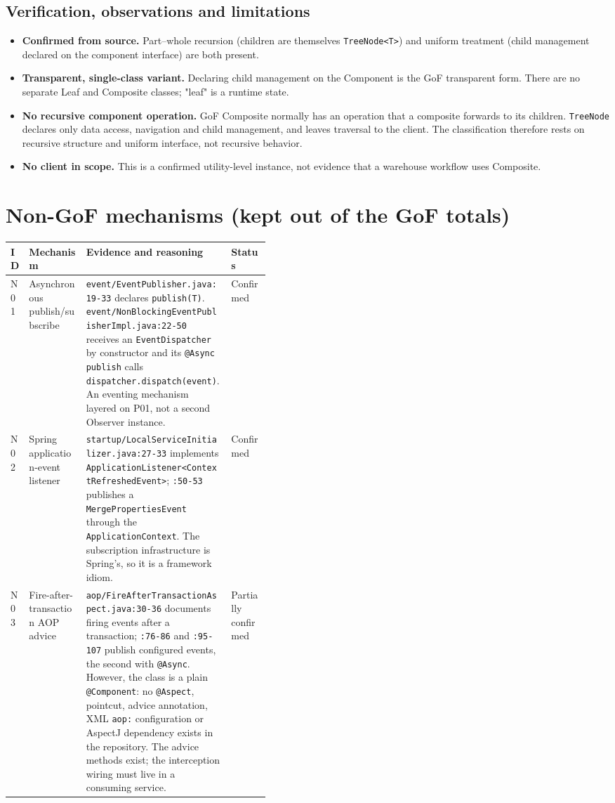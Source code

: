 \documentclass[11pt,a4paper]{article}
\newcommand{\code}[1]{\nolinkurl{#1}}
\begin{document}
\subsection{Verification, observations and limitations}
\begin{itemize}[nosep]
\item \textbf{Confirmed from source.} Part--whole recursion (children are themselves \code{TreeNode<T>}) and uniform treatment (child management declared on the component interface) are both present.
\item \textbf{Transparent, single-class variant.} Declaring child management on the Component is the GoF transparent form. There are no separate Leaf and Composite classes; "leaf" is a runtime state.
\item \textbf{No recursive component operation.} GoF Composite normally has an operation that a composite forwards to its children. \code{TreeNode} declares only data access, navigation and child management, and leaves traversal to the client. The classification therefore rests on recursive structure and uniform interface, not recursive behavior.
\item \textbf{No client in scope.} This is a confirmed utility-level instance, not evidence that a warehouse workflow uses Composite.
\end{itemize}

\section{Non-GoF mechanisms (kept out of the GoF totals)}

\begin{tabularx}{\linewidth}{@{}P{0.06\linewidth}P{0.22\linewidth}YP{0.15\linewidth}@{}}
\toprule
ID & Mechanism & Evidence and reasoning & Status\\
\midrule
N01 & Asynchronous publish/subscribe & \code{event/EventPublisher.java:19-33} declares \code{publish(T)}. \code{event/NonBlockingEventPublisherImpl.java:22-50} receives an \code{EventDispatcher} by constructor and its \code{@Async publish} calls \code{dispatcher.dispatch(event)}. An eventing mechanism layered on P01, not a second Observer instance. & Confirmed\\
N02 & Spring application-event listener & \code{startup/LocalServiceInitializer.java:27-33} implements \code{ApplicationListener<ContextRefreshedEvent>}; \code{:50-53} publishes a \code{MergePropertiesEvent} through the \code{ApplicationContext}. The subscription infrastructure is Spring's, so it is a framework idiom. & Confirmed\\
N03 & Fire-after-transaction AOP advice & \code{aop/FireAfterTransactionAspect.java:30-36} documents firing events after a transaction; \code{:76-86} and \code{:95-107} publish configured events, the second with \code{@Async}. However, the class is a plain \code{@Component}: no \code{@Aspect}, pointcut, advice annotation, XML \code{aop:} configuration or AspectJ dependency exists in the repository. The advice methods exist; the interception wiring must live in a consuming service. & Partially confirmed\\
\bottomrule
\end{tabularx}
\end{document}
